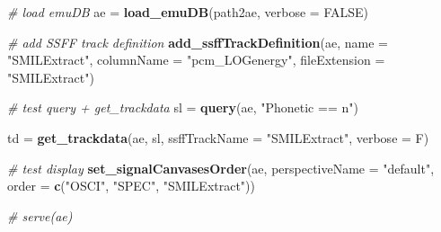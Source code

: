 \documentclass[]{book}
\newenvironment{Shaded}{\begin{snugshade}}{\end{snugshade}}
\newcommand{\CommentTok}[1]{\textcolor[rgb]{0.56,0.35,0.01}{\textit{#1}}}
\newcommand{\DataTypeTok}[1]{\textcolor[rgb]{0.13,0.29,0.53}{#1}}
\newcommand{\KeywordTok}[1]{\textcolor[rgb]{0.13,0.29,0.53}{\textbf{#1}}}
\newcommand{\NormalTok}[1]{#1}
\newcommand{\OtherTok}[1]{\textcolor[rgb]{0.56,0.35,0.01}{#1}}
\newcommand{\StringTok}[1]{\textcolor[rgb]{0.31,0.60,0.02}{#1}}
\begin{document}
\begin{Shaded}
\begin{Highlighting}[]
\CommentTok{# load emuDB}
\NormalTok{ae =}\StringTok{ }\KeywordTok{load_emuDB}\NormalTok{(path2ae, }\DataTypeTok{verbose =} \OtherTok{FALSE}\NormalTok{)}

\CommentTok{# add SSFF track definition}
\KeywordTok{add_ssffTrackDefinition}\NormalTok{(ae, }
                        \DataTypeTok{name =} \StringTok{"SMILExtract"}\NormalTok{, }
                        \DataTypeTok{columnName =} \StringTok{"pcm_LOGenergy"}\NormalTok{,}
                        \DataTypeTok{fileExtension =} \StringTok{"SMILExtract"}\NormalTok{)}

\CommentTok{# test query + get_trackdata}
\NormalTok{sl =}\StringTok{ }\KeywordTok{query}\NormalTok{(ae, }\StringTok{"Phonetic == n"}\NormalTok{)}

\NormalTok{td =}\StringTok{ }\KeywordTok{get_trackdata}\NormalTok{(ae, }
\NormalTok{                   sl, }
                   \DataTypeTok{ssffTrackName =} \StringTok{"SMILExtract"}\NormalTok{,}
                   \DataTypeTok{verbose =}\NormalTok{ F)}

\CommentTok{# test display}
\KeywordTok{set_signalCanvasesOrder}\NormalTok{(ae, }
                        \DataTypeTok{perspectiveName =} \StringTok{"default"}\NormalTok{,}
                        \DataTypeTok{order =} \KeywordTok{c}\NormalTok{(}\StringTok{"OSCI"}\NormalTok{, }\StringTok{"SPEC"}\NormalTok{, }\StringTok{"SMILExtract"}\NormalTok{))}

\CommentTok{# serve(ae)}
\end{Highlighting}
\end{Shaded}


\end{document}
